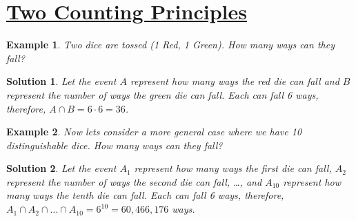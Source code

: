 \documentclass[12pt, letterpaper, onecolumn, conference, final]{IEEEtran}
\theoremstyle{definition}
\newtheorem{definition}{Definition}[section]
\theoremstyle{plain}
\newtheorem{example}{Example}[section]
\newtheorem{solution}{Solution}[section]
\begin{document}
\section{\textbf{\underline{Two Counting Principles}}}
\vspace{.3cm}
\begin{center}
\end{center}

\begin{example}
Two dice are tossed (1 Red, 1 Green). How many ways can they fall?
\end{example}
\begin{solution}
Let the event $A$ represent how many ways the red die can fall and $B$ represent the number of ways the green die can fall. Each can fall 6 ways, therefore, $A \cap B = 6 \cdot 6 = 36$. 
\end{solution}

\begin{example}
Now lets consider a more general case where we have 10 distinguishable dice. How many ways can they fall?
\end{example}
\begin{solution}
Let the event $A_1$ represent how many ways the first die can fall, $A_2$ represent the number of ways the second die can fall, \dots, and $A_{10}$ represent how many ways the tenth die can fall. Each can fall 6 ways, therefore, $A_1 \cap A_2 \cap \dots \cap A_{10} = 6^{10} = 60,466,176$ ways. 
\end{solution}
\end{document}

